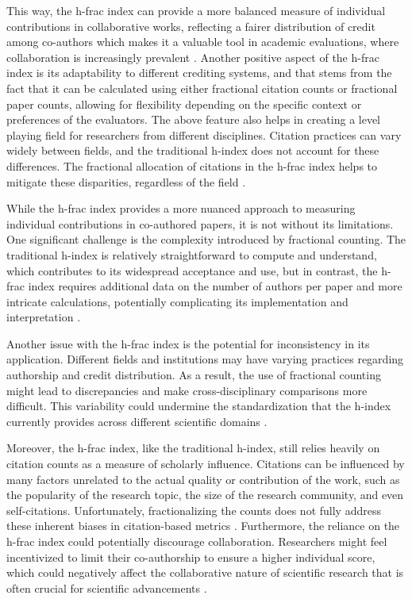 This way, the h-frac index can provide a more balanced measure of individual
contributions in collaborative works, reflecting a fairer distribution of
credit among co-authors which makes it a valuable tool in academic evaluations,
where collaboration is increasingly prevalent
\cite{egghe2008mathematical,singhal2023analysis}. Another positive aspect of
the h-frac index is its adaptability to different crediting systems, and that
stems from the fact that it can be calculated using either fractional citation
counts or fractional paper counts, allowing for flexibility depending on the
specific context or preferences of the evaluators. The above feature also helps
in creating a level playing field for researchers from different disciplines.
Citation practices can vary widely between fields, and the traditional h-index
does not account for these differences. The fractional allocation of citations
in the h-frac index helps to mitigate these disparities, regardless of the
field \cite{singhal2023analysis}.

While the h-frac index provides a more nuanced approach to measuring individual
contributions in co-authored papers, it is not without its limitations. One
significant challenge is the complexity introduced by fractional counting. The
traditional h-index is relatively straightforward to compute and understand,
which contributes to its widespread acceptance and use, but in contrast, the
h-frac index requires additional data on the number of authors per paper and
more intricate calculations, potentially complicating its implementation and
interpretation \cite{egghe2008mathematical,singhal2023analysis}.

Another issue with the h-frac index is the potential for inconsistency in its
application. Different fields and institutions may have varying practices
regarding authorship and credit distribution. As a result, the use of
fractional counting might lead to discrepancies and make cross-disciplinary
comparisons more difficult. This variability could undermine the
standardization that the h-index currently provides across different scientific
domains \cite{egghe2008mathematical,singhal2023analysis}.

Moreover, the h-frac index, like the traditional h-index, still relies heavily
on citation counts as a measure of scholarly influence. Citations can be
influenced by many factors unrelated to the actual quality or contribution of
the work, such as the popularity of the research topic, the size of the
research community, and even self-citations. Unfortunately, fractionalizing the
counts does not fully address these inherent biases in citation-based metrics
\cite{egghe2008mathematical}. Furthermore, the reliance on the h-frac index
could potentially discourage collaboration. Researchers might feel incentivized
to limit their co-authorship to ensure a higher individual score, which could
negatively affect the collaborative nature of scientific research that is often
crucial for scientific advancements \cite{singhal2023analysis}.

